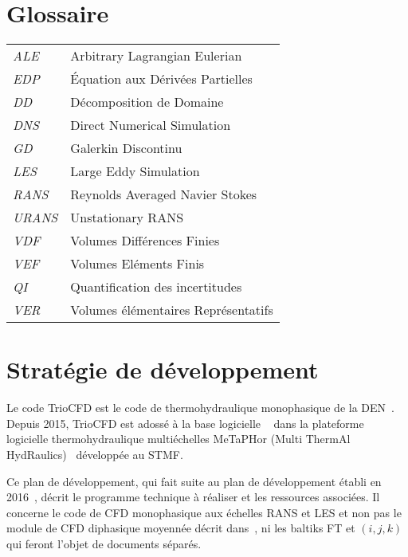 

\section*{Glossaire}

\begin{tabular}{ll}
{\it{ALE}} & Arbitrary Lagrangian Eulerian \\
{\it{EDP}} & \'Equation aux D\'eriv\'ees Partielles \\
{\it{DD}}  & D\'ecomposition de Domaine \\
{\it{DNS}}  & Direct Numerical Simulation \\
{\it{GD}}  & Galerkin Discontinu \\
{\it{LES}} & Large Eddy Simulation \\
{\it{RANS}}& Reynolds Averaged Navier Stokes \\
{\it{URANS}}& Unstationary RANS \\
{\it{VDF }} & Volumes Diff\'erences Finies \\
{\it{VEF }} & Volumes El\'ements Finis \\
{\it{QI }} & Quantification des incertitudes \\
{\it{VER }} & Volumes \'el\'ementaires Repr\'esentatifs \\

\end{tabular}

\section{Strat\'egie de d\'eveloppement}


Le code TrioCFD est le code de thermohydraulique monophasique de la DEN~\cite{OpenSourceTrio}. Depuis 2015, TrioCFD est adoss\'e \`a la base logicielle {}~\cite{TRUST} dans la plateforme logicielle thermohydraulique multi\'echelles MeTaPHor
(Multi ThermAl HydRaulics)~\cite{Metaphor} d\'evelopp\'ee au STMF. 

Ce plan de d\'eveloppement, qui fait suite au plan de d\'eveloppement \'etabli en 2016~\cite{Plan_dev_Trio_indiceB},  d\'ecrit le programme technique \`a r\'ealiser et les ressources associ\'ees. Il concerne le code de CFD monophasique aux \'echelles RANS et
LES et non pas le module de CFD diphasique moyenn\'ee d\'ecrit dans~\cite{Metaphor}, ni les baltiks FT et $(i,j,k)$ qui feront l'objet de documents s\'epar\'es.

